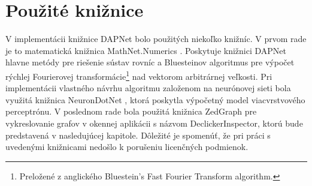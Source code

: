 \section{Použité knižnice}
V implementácii knižnice DAPNet bolo použitých niekoľko knižníc. V prvom rade je to matematická knižnica MathNet.Numerics \cite{Numerics}. Poskytuje knižnici DAPNet hlavne metódy pre riešenie sústav rovníc a Bluesteinov algoritmus pre výpočet rýchlej Fourierovej transformácie\footnote{Preložené z anglického Bluestein's Fast Fourier Transform algorithm.} nad vektorom arbitrárnej veľkosti. Pri implementácii vlastného návrhu algoritmu založenom na neurónovej sieti bola využitá knižnica NeuronDotNet \cite{NeuronDotNet}, ktorá poskytla výpočetný model viacvrstvového perceptrónu. V poslednom rade bola použitá knižnica ZedGraph \cite{ZedGraph} pre vykreslovanie grafov v okennej aplikácii s názvom DeclickerInspector, ktorú bude predstavená v nasledujúcej kapitole. Dôležité je spomenúť, že pri práci s uvedenými knižnicami nedošlo k porušeniu licenčných podmienok.